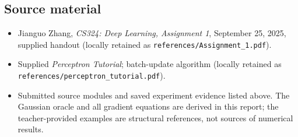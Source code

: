 \documentclass[10pt,a4paper]{article}
\newcommand{\code}[1]{\texttt{\small #1}}
\begin{document}
\subsection{Source material}
\begin{itemize}
\item Jianguo Zhang, \emph{CS324: Deep Learning, Assignment 1}, September 25, 2025, supplied handout (locally retained as \code{references/Assignment\_1.pdf}).
\item Supplied \emph{Perceptron Tutorial}; batch-update algorithm (locally retained as \code{references/perceptron\_tutorial.pdf}).
\item Submitted source modules and saved experiment evidence listed above. The Gaussian oracle and all gradient equations are derived in this report; the teacher-provided examples are structural references, not sources of numerical results.
\end{itemize}
\end{document}
